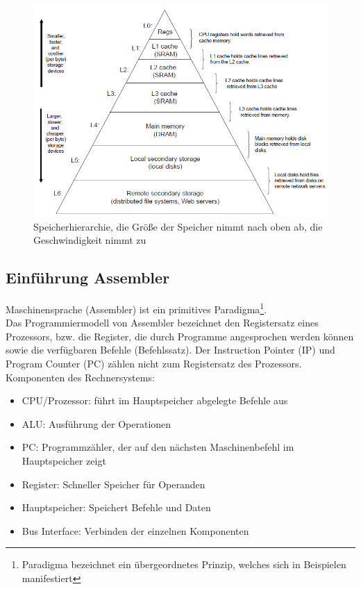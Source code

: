 \documentclass[a4paper,12pt,leqno]{article}
\begin{document}
\begin{figure}[h!]
\centering
\includegraphics[scale=0.5]{Grafiken/Speicherhierarchie.png}
\caption{Speicherhierarchie, die Größe der Speicher nimmt nach oben ab, die Geschwindigkeit nimmt zu}
\end{figure}

\subsection{Einführung Assembler}

Maschinensprache (Assembler) ist ein primitives Paradigma\footnote{Paradigma bezeichnet ein übergeordnetes Prinzip, welches sich in Beispielen manifestiert}.\\
Das Programmiermodell von Assembler bezeichnet den Registersatz eines Prozessors, bzw. die Register, die durch Programme angesprochen werden können sowie die verfügbaren Befehle (Befehlssatz). Der Instruction Pointer (IP) und Program Counter (PC) zählen nicht zum Registersatz des Prozessors.\\

Komponenten des Rechnersystems:
\begin{itemize}
\item CPU/Prozessor: führt im Hauptspeicher abgelegte Befehle aus
\item ALU: Ausführung der Operationen
\item PC: Programmzähler, der auf den nächsten Maschinenbefehl im Hauptspeicher zeigt
\item Register: Schneller Speicher für Operanden
\item Hauptspeicher: Speichert Befehle und Daten
\item Bus Interface: Verbinden der einzelnen Komponenten
\end{itemize}
\end{document}
